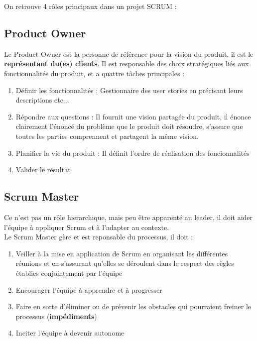 \documentclass{report}
\begin{document}
		On retrouve 4 rôles principaux dans un projet SCRUM : \\

		\subsection{Product Owner}

			Le Product Owner est la personne de référence pour la vision du produit, il est le \textbf{représentant du(es) clients}.
			Il est responsable des choix stratégiques liés aux fonctionnalités du produit, et a quattre tâches principales : \\

			\begin{enumerate}
				\item Définir les fonctionnalités : Gestionnaire des user stories en précisant leurs descriptions etc...
				\item Répondre aux questions : Il fournit une vision partagée du produit, il énonce clairement l'énoncé du problème que le produit doit résoudre, s'assure que toutes les parties comprennent et partagent la même vision.
				\item Planifier la vie du produit : Il définit l'ordre de réalisation des foncionnalités
				\item Valider le résultat
			\end{enumerate}

		\subsection{Scrum Master}

			Ce n'est pas un rôle hierarchique, mais peu être apparenté au leader, il doit aider l'équipe à appliquer Scrum et à l'adapter au contexte.\\

			Le Scrum Master gère et est reponsable du processus, il doit : \\

			\begin{enumerate}
				\item Veiller à la mise en application de Scrum en organisant les différentes réunions et en s'assurant qu'elles se déroulent dans le respect des règles établies conjointement par l'équipe
				\item Encourager l'équipe à apprendre et à progresser
				\item Faire en sorte d'éliminer ou de prévenir les obstacles qui pourraient freiner le processus (\textbf{impédiments})
				\item Inciter l'équipe à devenir autonome
			\end{enumerate}
\end{document}
